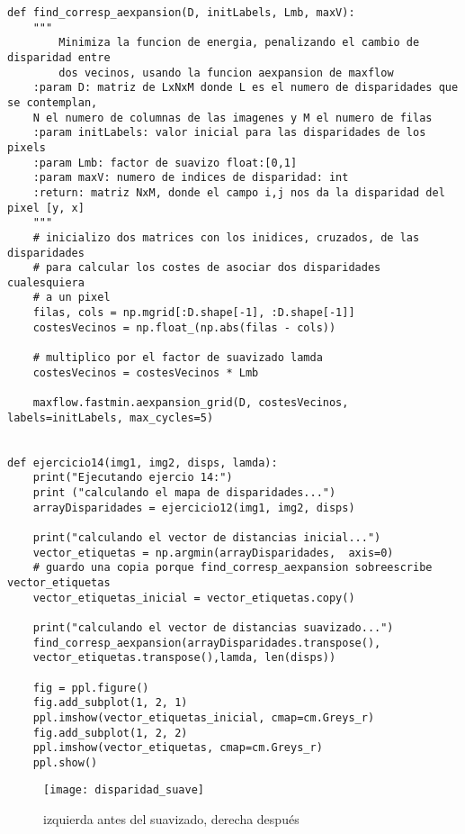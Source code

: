 \documentclass[paper=a4, fontsize=11pt]{scrartcl} %
\numberwithin{equation}{section} %
\numberwithin{figure}{section} %
\numberwithin{table}{section} %
\begin{document}
\begin{lstlisting}
def find_corresp_aexpansion(D, initLabels, Lmb, maxV):
    """
        Minimiza la funcion de energia, penalizando el cambio de disparidad entre 
        dos vecinos, usando la funcion aexpansion de maxflow
    :param D: matriz de LxNxM donde L es el numero de disparidades que se contemplan,
    N el numero de columnas de las imagenes y M el numero de filas
    :param initLabels: valor inicial para las disparidades de los pixels
    :param Lmb: factor de suavizo float:[0,1]
    :param maxV: numero de indices de disparidad: int
    :return: matriz NxM, donde el campo i,j nos da la disparidad del pixel [y, x]
    """
    # inicializo dos matrices con los inidices, cruzados, de las disparidades
    # para calcular los costes de asociar dos disparidades cualesquiera 
    # a un pixel
    filas, cols = np.mgrid[:D.shape[-1], :D.shape[-1]]
    costesVecinos = np.float_(np.abs(filas - cols))

    # multiplico por el factor de suavizado lamda
    costesVecinos = costesVecinos * Lmb

    maxflow.fastmin.aexpansion_grid(D, costesVecinos, labels=initLabels, max_cycles=5)

    
def ejercicio14(img1, img2, disps, lamda):
    print("Ejecutando ejercio 14:")
    print ("calculando el mapa de disparidades...")
    arrayDisparidades = ejercicio12(img1, img2, disps)

    print("calculando el vector de distancias inicial...")
    vector_etiquetas = np.argmin(arrayDisparidades,  axis=0)
    # guardo una copia porque find_corresp_aexpansion sobreescribe vector_etiquetas
    vector_etiquetas_inicial = vector_etiquetas.copy()

    print("calculando el vector de distancias suavizado...")
    find_corresp_aexpansion(arrayDisparidades.transpose(), 
    vector_etiquetas.transpose(),lamda, len(disps))

    fig = ppl.figure()
    fig.add_subplot(1, 2, 1)
    ppl.imshow(vector_etiquetas_inicial, cmap=cm.Greys_r)
    fig.add_subplot(1, 2, 2)
    ppl.imshow(vector_etiquetas, cmap=cm.Greys_r)
    ppl.show()

\end{lstlisting}

\begin{figure}
	\centering
	\texttt{[image: disparidad\_suave]}
	\caption{izquierda antes del suavizado, derecha después}
	\label{fig:fig}
\end{figure}
\end{document}
